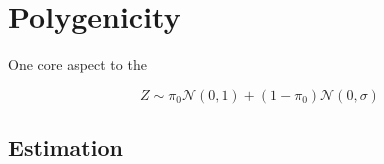 \documentclass{pset}
\date{6/1/2025}
\begin{document}
\maketitle

\section{Polygenicity}

One core aspect to the 


$$Z \sim \pi_0 \mathcal{N}(0,1) + (1 - \pi_0)\mathcal{N}(0,\sigma)$$

\subsection*{Estimation}


\section{}
\end{document}
